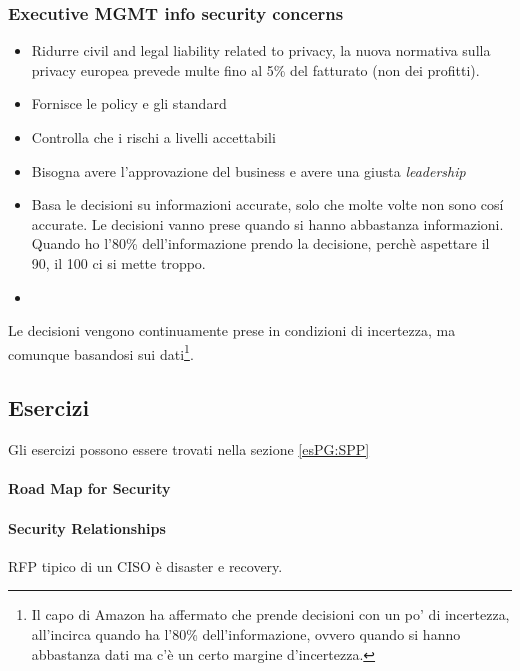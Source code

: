 \subsubsection{Executive MGMT info security concerns}

\begin{itemize}
\item Ridurre civil and legal liability related to privacy, la nuova normativa 
sulla privacy europea prevede multe fino al 5\% del fatturato (non dei 
profitti).
\item Fornisce le policy e gli standard
\item Controlla che i rischi a livelli accettabili
\item Bisogna avere l'approvazione del business e avere una giusta 
\textit{leadership}
\item Basa le decisioni su informazioni accurate, solo che molte volte non sono 
cosí accurate. Le decisioni vanno prese quando si hanno abbastanza informazioni. 
Quando ho l'80\% dell'informazione prendo la decisione, perchè aspettare il 90, 
il 100 ci si mette troppo.
\item {}
\end{itemize}


Le decisioni vengono continuamente prese in condizioni di incertezza, ma 
comunque basandosi sui dati\footnote{Il capo di Amazon ha affermato che prende 
decisioni con un po' di incertezza, all'incirca quando ha l'80\% 
dell'informazione, ovvero quando si hanno abbastanza dati ma c'è un certo 
margine d'incertezza.}.


\subsection{Esercizi}

Gli esercizi possono essere trovati nella sezione \ref{esPG:SPP}

\paragraph{Road Map for Security}

\paragraph{Security Relationships}


RFP tipico di un CISO è disaster e recovery. 


